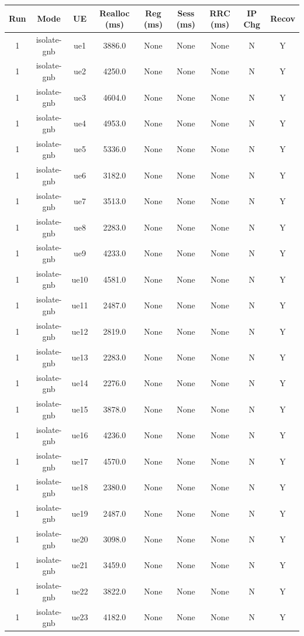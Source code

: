 \begin{table}[ht]
\centering
\begin{tabular}{|c|c|c|c|c|c|c|c|c|}
\hline
Run & Mode & UE & Realloc (ms) & Reg (ms) & Sess (ms) & RRC (ms) & IP Chg & Recov \\
\hline
1 & isolate-gnb & ue1 & 3886.0 & None & None & None & N & Y \\
1 & isolate-gnb & ue2 & 4250.0 & None & None & None & N & Y \\
1 & isolate-gnb & ue3 & 4604.0 & None & None & None & N & Y \\
1 & isolate-gnb & ue4 & 4953.0 & None & None & None & N & Y \\
1 & isolate-gnb & ue5 & 5336.0 & None & None & None & N & Y \\
1 & isolate-gnb & ue6 & 3182.0 & None & None & None & N & Y \\
1 & isolate-gnb & ue7 & 3513.0 & None & None & None & N & Y \\
1 & isolate-gnb & ue8 & 2283.0 & None & None & None & N & Y \\
1 & isolate-gnb & ue9 & 4233.0 & None & None & None & N & Y \\
1 & isolate-gnb & ue10 & 4581.0 & None & None & None & N & Y \\
1 & isolate-gnb & ue11 & 2487.0 & None & None & None & N & Y \\
1 & isolate-gnb & ue12 & 2819.0 & None & None & None & N & Y \\
1 & isolate-gnb & ue13 & 2283.0 & None & None & None & N & Y \\
1 & isolate-gnb & ue14 & 2276.0 & None & None & None & N & Y \\
1 & isolate-gnb & ue15 & 3878.0 & None & None & None & N & Y \\
1 & isolate-gnb & ue16 & 4236.0 & None & None & None & N & Y \\
1 & isolate-gnb & ue17 & 4570.0 & None & None & None & N & Y \\
1 & isolate-gnb & ue18 & 2380.0 & None & None & None & N & Y \\
1 & isolate-gnb & ue19 & 2487.0 & None & None & None & N & Y \\
1 & isolate-gnb & ue20 & 3098.0 & None & None & None & N & Y \\
1 & isolate-gnb & ue21 & 3459.0 & None & None & None & N & Y \\
1 & isolate-gnb & ue22 & 3822.0 & None & None & None & N & Y \\
1 & isolate-gnb & ue23 & 4182.0 & None & None & None & N & Y \\

\end{tabular}
\end{table}
